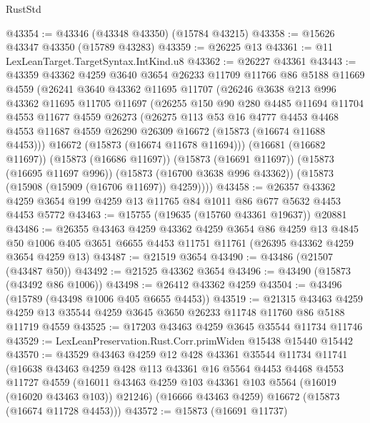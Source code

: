 \begin{lexlean}{RustStd}
\begin{coremodule}
@43354 := @43346 (@43348 @43350) (@15784 @43215)
@43358 := @15626 @43347 @43350 (@15789 @43283)
@43359 := @26225 @13
@43361 := @11 LexLeanTarget.TargetSyntax.IntKind.u8
@43362 := @26227 @43361
@43443 := @43359
    @43362
    @4259
    @3640
    @3654
    @26233
    @11709
    @11766
    @86
    @5188
    @11669
    @4559
    (@26241
      @3640
      @43362
      @11695
      @11707
      (@26246
        @3638
        @213
        @996
        @43362
        @11695
        @11705
        @11697
        (@26255
          @150
          @90
          @280
          @4485
          @11694
          @11704
          @4553
          @11677
          @4559
          @26273
          (@26275
            @113
            @53
            @16
            @4777
            @4453
            @4468
            @4553
            @11687
            @4559
            @26290
            @26309
            @16672
            (@15873 (@16674 @11688 @4453)))
          @16672
          (@15873 (@16674 @11678 @11694)))
        (@16681 (@16682 @11697))
        (@15873 (@16686 @11697))
        (@15873 (@16691 @11697))
        (@15873 (@16695 @11697 @996))
        (@15873 (@16700 @3638 @996 @43362))
        (@15873 (@15908 (@15909 (@16706 @11697)) @4259))))
@43458 := @26357 @43362 @4259 @3654 @199 @4259 @13 @11765 @84 @1011 @86 @677 @5632 @4453 @4453 @5772
@43463 := @15755 (@19635 (@15760 @43361 @19637)) @20881
@43486 := @26355
    @43463
    @4259
    @43362
    @4259
    @3654
    @86
    @4259
    @13
    @4845
    @50
    @1006
    @405
    @3651
    @6655
    @4453
    @11751
    @11761
    (@26395 @43362 @4259 @3654 @4259 @13)
@43487 := @21519 @3654
@43490 := @43486 (@21507 (@43487 @50))
@43492 := @21525 @43362 @3654
@43496 := @43490 (@15873 (@43492 @86 @1006))
@43498 := @26412 @43362 @4259
@43504 := @43496 (@15789 (@43498 @1006 @405 @6655 @4453))
@43519 := @21315
    @43463
    @4259
    @4259
    @13
    @35544
    @4259
    @3645
    @3650
    @26233
    @11748
    @11760
    @86
    @5188
    @11719
    @4559
@43525 := @17203 @43463 @4259 @3645 @35544 @11734 @11746
@43529 := LexLeanPreservation.Rust.Corr.primWiden @15438 @15440 @15442
@43570 := @43529
    @43463
    @4259
    @12
    @428
    @43361
    @35544
    @11734
    @11741
    (@16638
      @43463
      @4259
      @428
      @113
      @43361
      @16
      @5564
      @4453
      @4468
      @4553
      @11727
      @4559
      (@16011 @43463 @4259 @103 @43361 @103 @5564 (@16019 (@16020 @43463 @103)) @21246)
      (@16666 @43463 @4259)
      @16672
      (@15873 (@16674 @11728 @4453)))
@43572 := @15873 (@16691 @11737)

\end{coremodule}
\end{lexlean}
